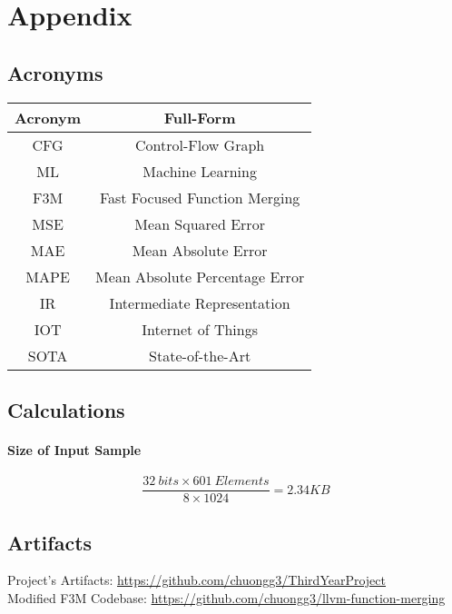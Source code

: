 \chapter{Appendix}
\section{Acronyms}

\begin{center}
\begin{tabular}{ |c|c| } 
 \hline
 \textbf{Acronym} & \textbf{Full-Form} \\ 
 \hline
 CFG & Control-Flow Graph \\ 
 ML & Machine Learning \\
 F3M & Fast Focused Function Merging\\
 MSE & Mean Squared Error\\
 MAE & Mean Absolute Error\\
 MAPE & Mean Absolute Percentage Error\\
 IR & Intermediate Representation\\
 IOT & Internet of Things\\
 SOTA & State-of-the-Art \\
 \hline
\end{tabular}
\end{center}


\section{Calculations}
\subsubsection{Size of Input Sample} \label{Calculation:InputSize}
$$\frac{32\ bits \times 601\ Elements}{8 \times 1024} = 2.34KB$$



\section{Artifacts} \label{Artifacts}
Project's Artifacts: \url{https://github.com/chuongg3/ThirdYearProject} \\
Modified F3M Codebase: \url{https://github.com/chuongg3/llvm-function-merging}

